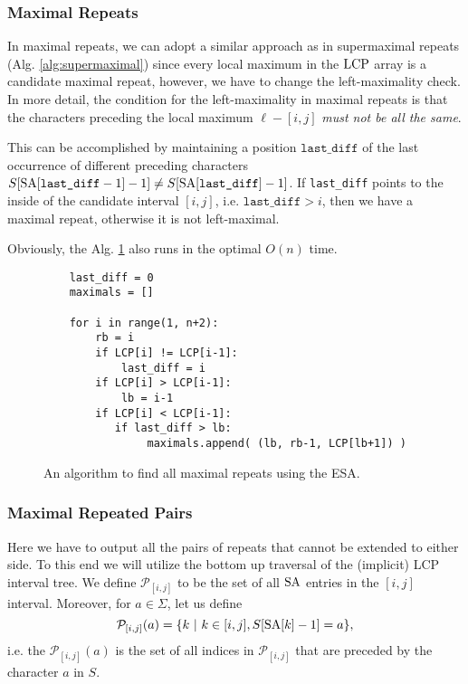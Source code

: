 \subsubsection{Maximal Repeats}
In maximal repeats, we can adopt a similar approach as in supermaximal repeats (Alg. \ref{alg:supermaximal}) since every local maximum in the $\text{LCP}$ array is a candidate maximal repeat, however, we have to change the left-maximality check.
In more detail, the condition for the left-maximality in maximal repeats is that the characters preceding the local maximum $\ell-[i, j]$ \textit{must not be all the same}.

This can be accomplished by maintaining a position $\texttt{last\_diff}$ of the last occurrence of different preceding characters $S[\text{SA}[\texttt{last\_diff}-1] - 1 ] \neq S[\text{SA}[\texttt{last\_diff}]-1]$.
If \texttt{last\_diff} points to the inside of the candidate interval $[i,j]$, i.e. $\texttt{last\_diff} > i$, then we have a maximal repeat, otherwise it is not left-maximal.

Obviously, the Alg. \ref{alg:maximal} also runs in the optimal $O(n)$ time.

\begin{figure}[!ht]
    \centering
    \begin{verbatim}
    last_diff = 0
    maximals = []
    
    for i in range(1, n+2):
        rb = i
        if LCP[i] != LCP[i-1]:
            last_diff = i
        if LCP[i] > LCP[i-1]:
            lb = i-1
        if LCP[i] < LCP[i-1]:
           if last_diff > lb:
                maximals.append( (lb, rb-1, LCP[lb+1]) )
    \end{verbatim}
    \caption{An algorithm to find all maximal repeats using the ESA.}
    \label{alg:maximal}
\end{figure}

\subsubsection{Maximal Repeated Pairs}
Here we have to output all the pairs of repeats that cannot be extended to either side.
To this end we will utilize the bottom up traversal of the (implicit) LCP interval tree.
We define $\mathcal{P}_{[i, j]}$ to be the set of all $\text{SA}$ entries in the $[i,j]$ interval. Moreover, for $a \in \Sigma$, let us define $$\mathcal{P}_{[i, j]}(a) = \{ k ~|~ k \in [i, j], S[\text{SA}[k] - 1] = a \},$$
i.e. the $\mathcal{P}_{[i, j]}(a)$ is the set of all indices in $\mathcal{P}_{[i, j]}$ that are preceded by the character $a$ in $S$.

